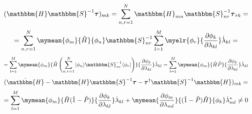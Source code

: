 \begin{frame}{}
$$(\mathbbm{H}\mathbbm{S}^{-1}\boldsymbol{\tau})_{mk}=\sum_{n,r=1}^N\mathbbm{H}_{mn}\mathbbm{S}^{-1}_{nr}\boldsymbol{\tau}_{rk}=$$
$$=\sum_{n,r=1}^N\mymean{\phi_m}{\hat{H}}{\phi_n}\mathbbm{S}^{-1}_{nr}\sum_{l=1}^M\myelr{\phi_r}{\frac{\partial\phi_k}{\partial\lambda_{kl}}}\dot{\lambda}_{kl}=$$
$$=\sum_{l=1}^M\mymean{\phi_m}{\hat{H}\left(\sum_{n,r=1}^N|\phi_n\rangle\mathbbm{S}^{-1}_{nr}\langle\phi_r|\right)}{\frac{\partial\phi_k}{\partial\lambda_{kl}}}\dot{\lambda}_{kl}=%
\sum_{l=1}^M\mymean{\phi_m}{\hat{H}\hat{P}}{\frac{\partial\phi_k}{\partial\lambda_{kl}}}\dot{\lambda}_{kl}$$
$$(\dot{\mathbbm{H}} - \mathbbm{H}\mathbbm{S}^{-1}\boldsymbol{\tau}-\boldsymbol{\tau}^{\dagger}\mathbbm{S}^{-1}\mathbbm{H})_{mk}=$$
$$=\sum_{l=1}^M\mymean{\phi_m}%
		      {\hat{H}(\hat{1}-\hat{P})}%
		      {\frac{\partial\phi_k}{\partial\lambda_{kl}}}\dot{\lambda}_{kl}+%
	       \mymean{\frac{\partial\phi_m}{\partial\lambda_{ml}}}%
		      {(\hat{1}-\hat{P})\hat{H}}%
		      {\phi_k}\dot{\lambda}_{ml}^*\neq0$$

\end{frame}

